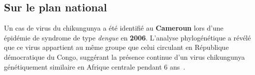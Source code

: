 \subsection{Sur le plan national}
Un cas de virus du chikungunya a été identifié au \textbf{Cameroun} lors d'une épidémie de syndrome de type \textit{dengue} en \textbf{2006}. L'analyse phylogénétique a révélé que ce virus appartient au même groupe que celui circulant en République démocratique du Congo, suggérant la présence continue d'un virus chikungunya génétiquement similaire en Afrique centrale pendant 6 ans~\cite{Peyrefitte2007}.